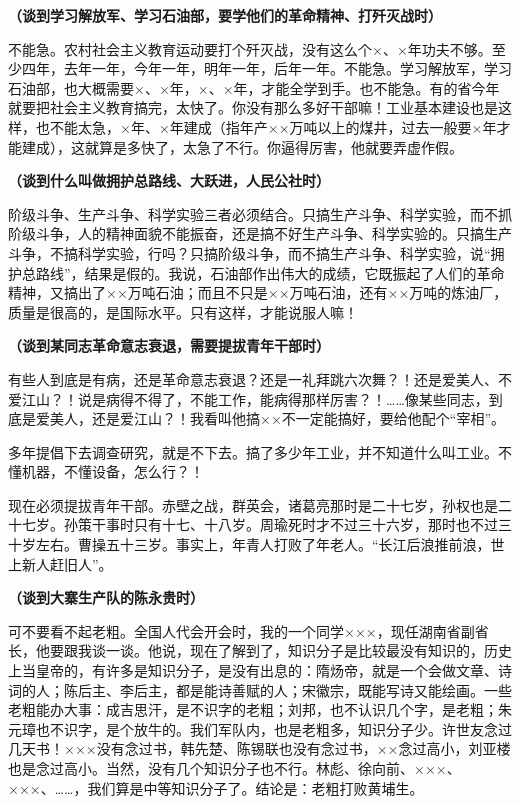 \textbf{（谈到学习解放军、学习石油部，要学他们的革命精神、打歼灭战时）}

不能急。农村社会主义教育运动要打个歼灭战，没有这么个×、×年功夫不够。至少四年，去年一年，今年一年，明年一年，后年一年。不能急。学习解放军，学习石油部，也大概需要×、×年，×、×年，才能全学到手。也不能急。有的省今年就要把社会主义教育搞完，太快了。你没有那么多好干部嘛！工业基本建设也是这样，也不能太急，×年、×年建成（指年产××万吨以上的煤井，过去一般要×年才能建成），这就算是多快了，太急了不行。你逼得厉害，他就要弄虚作假。

\textbf{（谈到什么叫做拥护总路线、大跃进，人民公社时）}

阶级斗争、生产斗争、科学实验三者必须结合。只搞生产斗争、科学实验，而不抓阶级斗争，人的精神面貌不能振奋，还是搞不好生产斗争、科学实验的。只搞生产斗争，不搞科学实验，行吗？只搞阶级斗争，而不搞生产斗争、科学实验，说“拥护总路线”，结果是假的。我说，石油部作出伟大的成绩，它既振起了人们的革命精神，又搞出了××万吨石油；而且不只是××万吨石油，还有××万吨的炼油厂，质量是很高的，是国际水平。只有这样，才能说服人嘛！

\textbf{（谈到某同志革命意志衰退，需要提拔青年干部时）}

有些人到底是有病，还是革命意志衰退？还是一礼拜跳六次舞？！还是爱美人、不爱江山？！说是病得不得了，不能工作，能病得那样厉害？！……像某些同志，到底是爱美人，还是爱江山？！我看叫他搞××不一定能搞好，要给他配个“宰相”。

多年提倡下去调查研究，就是不下去。搞了多少年工业，并不知道什么叫工业。不懂机器，不懂设备，怎么行？！

现在必须提拔青年干部。赤壁之战，群英会，诸葛亮那时是二十七岁，孙权也是二十七岁。孙策干事时只有十七、十八岁。周瑜死时才不过三十六岁，那时也不过三十岁左右。曹操五十三岁。事实上，年青人打败了年老人。“长江后浪推前浪，世上新人赶旧人”。

\textbf{（谈到大寨生产队的陈永贵时）}

可不要看不起老粗。全国人代会开会时，我的一个同学×××，现任湖南省副省长，他要跟我谈一谈。他说，现在了解到了，知识分子是比较最没有知识的，历史上当皇帝的，有许多是知识分子，是没有出息的：隋炀帝，就是一个会做文章、诗词的人；陈后主、李后主，都是能诗善赋的人；宋徽宗，既能写诗又能绘画。一些老粗能办大事：成吉思汗，是不识字的老粗；刘邦，也不认识几个字，是老粗；朱元璋也不识字，是个放牛的。我们军队内，也是老粗多，知识分子少。许世友念过几天书！×××没有念过书，韩先楚、陈锡联也没有念过书，××念过高小，刘亚楼也是念过高小。当然，没有几个知识分子也不行。林彪、徐向前、×××、×××、……，我们算是中等知识分子了。结论是：老粗打败黄埔生。

